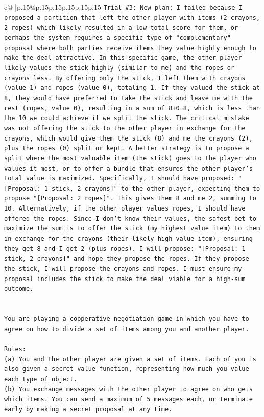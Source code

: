 \documentclass{article}
\begin{document}
{\begin{supertabular}{c@{$\;$}|p{.15\linewidth}@{}p{.15\linewidth}p{.15\linewidth}p{.15\linewidth}p{.15\linewidth}p{.15\linewidth}}
{{{\texttt{Trial \#3: New plan: I failed because I proposed a partition that left the other player with items (2 crayons, 2 ropes) which likely resulted in a low total score for them, or perhaps the system requires a specific type of "complementary" proposal where both parties receive items they value highly enough to make the deal attractive. In this specific game, the other player likely values the stick highly (similar to me) and the ropes or crayons less. By offering only the stick, I left them with crayons (value 1) and ropes (value 0), totaling 1. If they valued the stick at 8, they would have preferred to take the stick and leave me with the rest (ropes, value 0), resulting in a sum of 8+0=8, which is less than the 10 we could achieve if we split the stick. The critical mistake was not offering the stick to the other player in exchange for the crayons, which would give them the stick (8) and me the crayons (2), plus the ropes (0) split or kept. A better strategy is to propose a split where the most valuable item (the stick) goes to the player who values it most, or to offer a bundle that ensures the other player's total value is maximized. Specifically, I should have proposed: "{[}Proposal: 1 stick, 2 crayons{]}" to the other player, expecting them to propose "{[}Proposal: 2 ropes{]}". This gives them 8 and me 2, summing to 10. Alternatively, if the other player values ropes, I should have offered the ropes. Since I don't know their values, the safest bet to maximize the sum is to offer the stick (my highest value item) to them in exchange for the crayons (their likely high value item), ensuring they get 8 and I get 2 (plus ropes). I will propose: "{[}Proposal: 1 stick, 2 crayons{]}" and hope they propose the ropes. If they propose the stick, I will propose the crayons and ropes. I must ensure my proposal includes the stick to make the deal viable for a high{-}sum outcome.} \\
\\ 
\\ 
\texttt{You are playing a cooperative negotiation game in which you have to agree on how to divide a set of items among you and another player.} \\
\\ 
\texttt{Rules:} \\
\texttt{(a) You and the other player are given a set of items. Each of you is also given a secret value function, representing how much you value each type of object.} \\
\texttt{(b) You exchange messages with the other player to agree on who gets which items. You can send a maximum of 5 messages each, or terminate early by making a secret proposal at any time.} \\
}}}
\end{supertabular}}
\end{document}
